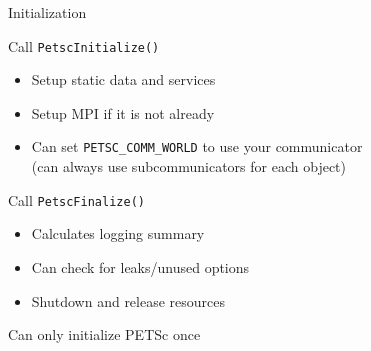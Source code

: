 \begin{frame}[fragile]{Initialization}

\begin{block}{Call \lstinline|PetscInitialize()|}
  \begin{itemize}
    \item Setup static data and services
    \item Setup MPI if it is not already
    \item Can set \lstinline|PETSC_COMM_WORLD| to use your communicator \\
      (can always use subcommunicators for each object)
  \end{itemize}
\end{block}

\begin{block}{Call \lstinline|PetscFinalize()|}
  \begin{itemize}
    \item Calculates logging summary
    \item Can check for leaks/unused options
    \item Shutdown and release resources
  \end{itemize}
\end{block}

\begin{block}{Can only initialize PETSc once}
\end{block}

\end{frame}
